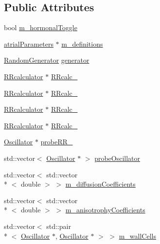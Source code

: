 \subsection*{Public Attributes}
\begin{DoxyCompactItemize}
\item 
bool \hyperlink{class_atrial_machine2d_a784a6fb0c363c6858e992957279a28ea}{m\+\_\+hormonal\+Toggle}
\item 
\hyperlink{classatrial_parameters}{atrial\+Parameters} $\ast$ \hyperlink{class_atrial_machine2d_aeafb998f5621fb19749014161d7d600d}{m\+\_\+definitions}
\item 
\hyperlink{class_random_generator}{Random\+Generator} \hyperlink{class_atrial_machine2d_a4ee41f8430aca76d5c6411cd37c92d38}{generator}
\item 
\hyperlink{class_r_rcalculator}{R\+Rcalculator} $\ast$ \hyperlink{class_atrial_machine2d_ace665fff3f0583d9d1e285f4775adfa6}{R\+Rcalc\+\_}
\item 
\hyperlink{class_r_rcalculator}{R\+Rcalculator} $\ast$ \hyperlink{class_atrial_machine2d_a34b1581457faa0fec1579cf51a187598}{R\+Rcalc\+\_}
\item 
\hyperlink{class_r_rcalculator}{R\+Rcalculator} $\ast$ \hyperlink{class_atrial_machine2d_a0bcbe6368dd8bb0eb66efaafc5a4dbfb}{R\+Rcalc\+\_}
\item 
\hyperlink{class_r_rcalculator}{R\+Rcalculator} $\ast$ \hyperlink{class_atrial_machine2d_aa2ede01ca50864789c112cca567c1444}{R\+Rcalc\+\_}
\item 
\hyperlink{class_oscillator}{Oscillator} $\ast$ \hyperlink{class_atrial_machine2d_ae73cbdaac9845bd587afefab6c8c94fa}{probe\+R\+R\+\_}
\item 
std\+::vector$<$ \hyperlink{class_oscillator}{Oscillator} $\ast$ $>$ \hyperlink{class_atrial_machine2d_a0f0e192be32cbbfa3f327cfe6e174f5e}{probe\+Oscillator}
\item 
std\+::vector$<$ std\+::vector\\*
$<$ double $>$ $>$ \hyperlink{class_atrial_machine2d_a13e43c0cfd52339dac5ac7ed5a88a88a}{m\+\_\+diffusion\+Coefficients}
\item 
std\+::vector$<$ std\+::vector\\*
$<$ double $>$ $>$ \hyperlink{class_atrial_machine2d_abd24f8eb85fef1ffa94d910e1a87dda8}{m\+\_\+anisotrophy\+Coefficients}
\item 
std\+::vector$<$ std\+::pair\\*
$<$ \hyperlink{class_oscillator}{Oscillator} $\ast$, \hyperlink{class_oscillator}{Oscillator} $\ast$ $>$ $>$ \hyperlink{class_atrial_machine2d_aea2f8cb631c24f1dbec8859d50a7918f}{m\+\_\+wall\+Cells}

\end{DoxyCompactItemize}
